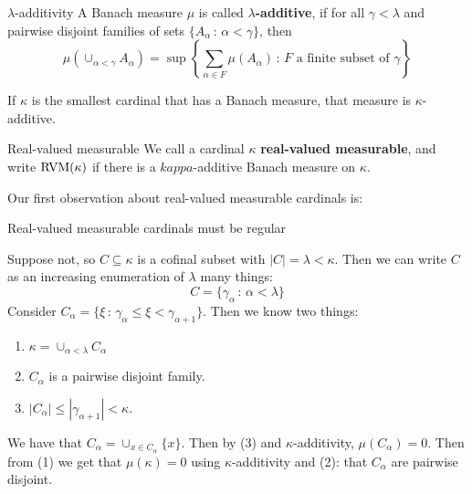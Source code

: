\documentclass{article}
\begin{document}
\begin{fancydefine}{$\lambda$-additivity}
    A Banach measure $\mu$ is called $\lambda$\textbf{-additive}, if for all $\gamma < \lambda$ and pairwise disjoint families of sets $\{A_{\alpha} \, : \, \alpha < \gamma\}$, then \[ \mu\left(\cup_{\alpha < \gamma} A_{\alpha}\right) = \sup \left\{ \sum_{\alpha \in F} \mu(A_{\alpha}) \, : \, F \text{ a finite subset of $\gamma$}\right\}\]
\end{fancydefine}
\begin{fancythm}{}
    If $\kappa$ is the smallest cardinal that has a Banach measure, that measure is $\kappa$-additive.
\end{fancythm}
\begin{fancydefine}{Real-valued measurable}
    We call a cardinal $\kappa$ \textbf{real-valued measurable}, and write $\operatorname{RVM}(\kappa)$ if there is a $kappa$-additive Banach measure on $\kappa$.
\end{fancydefine}
Our first observation about real-valued measurable cardinals is: \begin{fancyprop}{}
    Real-valued measurable cardinals must be regular
\end{fancyprop}
\proof Suppose not, so $C \subseteq \kappa$ is a cofinal subset with $|C|=\lambda <\kappa$. Then we can write $C$ as an increasing enumeration of $\lambda$ many things: \[ C = \{\gamma_{\alpha} \, : \, \alpha < \lambda\}\]
Consider $C_{\alpha} = \{ \xi \, : \, \gamma_{\alpha} \leq \xi < \gamma_{\alpha+1}\}$. Then we know two things: \begin{enumerate}
    \item $\kappa = \cup_{\alpha < \lambda} C_{\alpha}$
    \item $C_{\alpha}$ is a pairwise disjoint family.
    \item $|C_{\alpha}| \leq |\gamma_{\alpha+1}| < \kappa$.
\end{enumerate}
We have that $C_{\alpha} = \cup_{x \in C_{\alpha}} \{x\}$. Then by (3) and $\kappa$-additivity, $\mu(C_{\alpha})=0$. Then from (1) we get that $\mu(\kappa)=0$ using $\kappa$-additivity and (2): that $C_{\alpha}$ are pairwise disjoint.
\end{document}
